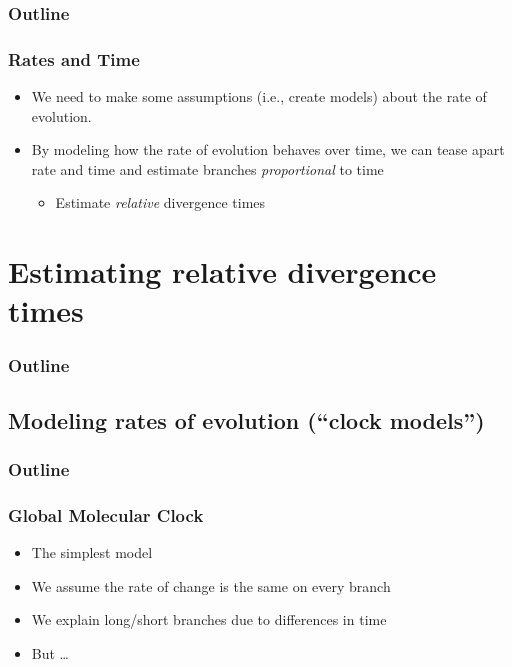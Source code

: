 \begin{frame}
\frametitle{Outline}
\tableofcontents[currentsection]
\end{frame}



\begin{frame}
    \frametitle{Rates and Time}
    \begin{itemize}
        \item We need to make some assumptions (i.e., create models)
            about the rate of evolution.
        \item By modeling how the rate of evolution behaves over time,
            we can tease apart rate and time and estimate branches
            \emph{proportional} to time
        \begin{itemize}
            \item Estimate \emph{relative} divergence times
        \end{itemize}
    \end{itemize}
\end{frame}


\section{Estimating relative divergence times}

\begin{frame}
\frametitle{Outline}
\tableofcontents[currentsection]
\end{frame}


\subsection{Modeling rates of evolution (``clock models'')}

\begin{frame}
\frametitle{Outline}
\tableofcontents[currentsection]
\end{frame}


\begin{frame}
    \frametitle{Global Molecular Clock}
    \begin{itemize}
        \item The simplest model
        \item We assume the rate of change is the same on every branch
        \item We explain long/short branches due to differences in time
        \item But \ldots
    \end{itemize}
\end{frame}

